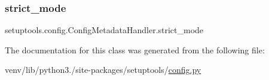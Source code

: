 \subsubsection{\texorpdfstring{strict\+\_\+mode}{strict\_mode}}
{\footnotesize\ttfamily setuptools.\+config.\+Config\+Metadata\+Handler.\+strict\+\_\+mode\hspace{0.3cm}{\ttfamily [static]}}



The documentation for this class was generated from the following file\+:\begin{DoxyCompactItemize}
\item 
venv/lib/python3./site-\/packages/setuptools/\hyperlink{setuptools_2config_8py}{config.\+py}\end{DoxyCompactItemize}
